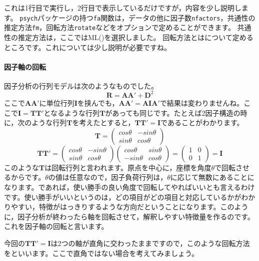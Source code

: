 \documentclass{ltjsbook}
\begin{document}
これは1行目で実行し，2行目で表示しているだけですが，内容を少し説明します。
\texttt{psych}パッケージの持つ\texttt{fa}関数は，データの他に因子数\texttt{nfactors}，共通性の推定方法\texttt{fm}，回転方法\texttt{rotate}などをオプションで定めることができます。
共通性の推定方法は，ここではML()を選択しました。
回転方法とはについて定めるところです。これについては少し説明が必要ですね。

\paragraph{因子軸の回転}
因子分析の行列モデルは次のようなものでした。
\[ \bm{R}= \bm{AA'}+\bm{D}^2 \]
ここで$\bm{AA'}$に単位行列$\bm{I}$を挟んでも，$\bm{AA'}=\bm{AIA'}$で結果は変わりませんね。ここで$\bm{I} = \bm{TT'}$となるような行列$\bm{T}$があっても同じです。たとえば2因子構造の時に，次のような行列$\bm{T}$を考えたとすると，$\bm{TT'}=\bm{I}$であることがわかります。
\[
     \bm{T} = \begin{pmatrix} cos \theta & -sin \theta \\ sin \theta & cos\theta \end{pmatrix}
\]
\[
\bm{TT'}=\begin{pmatrix} cos \theta & -sin \theta \\ sin \theta & cos\theta \end{pmatrix}
    \begin{pmatrix} cos \theta & sin \theta \\ -sin \theta & cos\theta \end{pmatrix}
    =\begin{pmatrix} 1 & 0 \\ 0 & 1 \end{pmatrix} =\bm{I}
 \]
このような$\bm{T}$は回転行列と言われます。原点を中心に，座標を角度$\theta$で回転させるからです。$\theta$の値は任意なので，因子負荷行列は，$\theta$に応じて無数にあることになります。であれば，使い勝手の良い角度で回転してやればいいとも言えるわけです。使い勝手がいいというのは，どの項目がどの項目と対応しているかがわかりやすい，特徴がはっきりするような方向だということになります。このように，因子分析が終わったら軸を回転させて，解釈しやすい特徴量を作るのです。これを因子軸の回転と言います。

今回の$\bm{TT'}=\bm{I}$は2つの軸が直角に交わったままですので，このような回転方法をといいます。ここで直角ではない場合を考えてみましょう。
\end{document}
